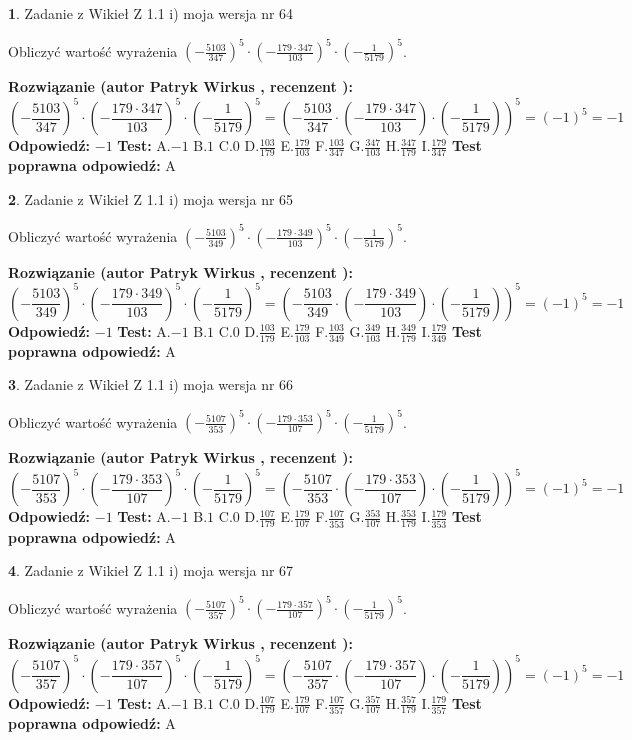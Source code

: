 \documentclass[12pt, a4paper]{article}
\theoremstyle{definition} %
\newtheorem{zad}{}
\newcommand{\zadStart}[1]{\begin{zad}#1\newline}
\newcommand{\zadStop}{\end{zad}}
\newcommand{\rozwStart}[2]{\noindent \textbf{Rozwiązanie (autor #1 , recenzent #2): }\newline}
\newcommand{\rozwStop}{\newline}
\newcommand{\odpStart}{\noindent \textbf{Odpowiedź:}\newline}
\newcommand{\odpStop}{\newline}
\newcommand{\testStart}{\noindent \textbf{Test:}\newline}
\newcommand{\testStop}{\newline}
\newcommand{\kluczStart}{\noindent \textbf{Test poprawna odpowiedź:}\newline}
\newcommand{\kluczStop}{\newline}
\begin{document}
\zadStart{Zadanie z Wikieł Z 1.1 i) moja wersja nr 64}

Obliczyć wartość wyrażenia $(-\frac{5103}{347})^{5} \cdot (-\frac{179 \cdot 347}{103})^{5} \cdot (-\frac{1}{5179})^{5}$.
\zadStop
\rozwStart{Patryk Wirkus}{}
$$(-\frac{5103}{347})^{5} \cdot (-\frac{179 \cdot 347}{103})^{5} \cdot (-\frac{1}{5179})^{5} = (-\frac{5103}{347} \cdot (-\frac{179 \cdot 347}{103}) \cdot (-\frac{1}{5179}))^{5} = (-1)^{5} = -1$$
\rozwStop
\odpStart
$-1$
\odpStop
\testStart
A.$-1$ B.$1$ C.$0$ D.$\frac{103}{179}$ E.$\frac{179}{103}$
F.$\frac{103}{347}$ G.$\frac{347}{103}$
H.$\frac{347}{179}$
I.$\frac{179}{347}$
\testStop
\kluczStart
A
\kluczStop



\zadStart{Zadanie z Wikieł Z 1.1 i) moja wersja nr 65}

Obliczyć wartość wyrażenia $(-\frac{5103}{349})^{5} \cdot (-\frac{179 \cdot 349}{103})^{5} \cdot (-\frac{1}{5179})^{5}$.
\zadStop
\rozwStart{Patryk Wirkus}{}
$$(-\frac{5103}{349})^{5} \cdot (-\frac{179 \cdot 349}{103})^{5} \cdot (-\frac{1}{5179})^{5} = (-\frac{5103}{349} \cdot (-\frac{179 \cdot 349}{103}) \cdot (-\frac{1}{5179}))^{5} = (-1)^{5} = -1$$
\rozwStop
\odpStart
$-1$
\odpStop
\testStart
A.$-1$ B.$1$ C.$0$ D.$\frac{103}{179}$ E.$\frac{179}{103}$
F.$\frac{103}{349}$ G.$\frac{349}{103}$
H.$\frac{349}{179}$
I.$\frac{179}{349}$
\testStop
\kluczStart
A
\kluczStop



\zadStart{Zadanie z Wikieł Z 1.1 i) moja wersja nr 66}

Obliczyć wartość wyrażenia $(-\frac{5107}{353})^{5} \cdot (-\frac{179 \cdot 353}{107})^{5} \cdot (-\frac{1}{5179})^{5}$.
\zadStop
\rozwStart{Patryk Wirkus}{}
$$(-\frac{5107}{353})^{5} \cdot (-\frac{179 \cdot 353}{107})^{5} \cdot (-\frac{1}{5179})^{5} = (-\frac{5107}{353} \cdot (-\frac{179 \cdot 353}{107}) \cdot (-\frac{1}{5179}))^{5} = (-1)^{5} = -1$$
\rozwStop
\odpStart
$-1$
\odpStop
\testStart
A.$-1$ B.$1$ C.$0$ D.$\frac{107}{179}$ E.$\frac{179}{107}$
F.$\frac{107}{353}$ G.$\frac{353}{107}$
H.$\frac{353}{179}$
I.$\frac{179}{353}$
\testStop
\kluczStart
A
\kluczStop



\zadStart{Zadanie z Wikieł Z 1.1 i) moja wersja nr 67}

Obliczyć wartość wyrażenia $(-\frac{5107}{357})^{5} \cdot (-\frac{179 \cdot 357}{107})^{5} \cdot (-\frac{1}{5179})^{5}$.
\zadStop
\rozwStart{Patryk Wirkus}{}
$$(-\frac{5107}{357})^{5} \cdot (-\frac{179 \cdot 357}{107})^{5} \cdot (-\frac{1}{5179})^{5} = (-\frac{5107}{357} \cdot (-\frac{179 \cdot 357}{107}) \cdot (-\frac{1}{5179}))^{5} = (-1)^{5} = -1$$
\rozwStop
\odpStart
$-1$
\odpStop
\testStart
A.$-1$ B.$1$ C.$0$ D.$\frac{107}{179}$ E.$\frac{179}{107}$
F.$\frac{107}{357}$ G.$\frac{357}{107}$
H.$\frac{357}{179}$
I.$\frac{179}{357}$
\testStop
\kluczStart
A
\kluczStop
\end{document}
